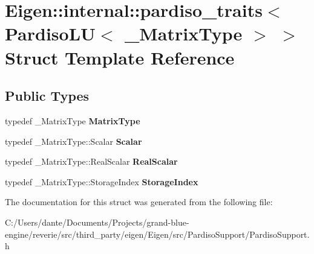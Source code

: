 \hypertarget{struct_eigen_1_1internal_1_1pardiso__traits_3_01_pardiso_l_u_3_01___matrix_type_01_4_01_4}{}\section{Eigen\+::internal\+::pardiso\+\_\+traits$<$ Pardiso\+LU$<$ \+\_\+\+Matrix\+Type $>$ $>$ Struct Template Reference}
\label{struct_eigen_1_1internal_1_1pardiso__traits_3_01_pardiso_l_u_3_01___matrix_type_01_4_01_4}
\subsection*{Public Types}
\begin{DoxyCompactItemize}
\item 
\mbox{\label{struct_eigen_1_1internal_1_1pardiso__traits_3_01_pardiso_l_u_3_01___matrix_type_01_4_01_4_a6253d589ffa5c063fde5c732c81fd6d4}} 
typedef \+\_\+\+Matrix\+Type {\bfseries Matrix\+Type}
\item 
\mbox{\label{struct_eigen_1_1internal_1_1pardiso__traits_3_01_pardiso_l_u_3_01___matrix_type_01_4_01_4_a12a540bf60b60e726d39cfe197e67bf0}} 
typedef \+\_\+\+Matrix\+Type\+::\+Scalar {\bfseries Scalar}
\item 
\mbox{\label{struct_eigen_1_1internal_1_1pardiso__traits_3_01_pardiso_l_u_3_01___matrix_type_01_4_01_4_af2ab1adecb2d6eda3747192d1cc9a978}} 
typedef \+\_\+\+Matrix\+Type\+::\+Real\+Scalar {\bfseries Real\+Scalar}
\item 
\mbox{\label{struct_eigen_1_1internal_1_1pardiso__traits_3_01_pardiso_l_u_3_01___matrix_type_01_4_01_4_a87c2c1664ec2a6a1375576173fda930a}} 
typedef \+\_\+\+Matrix\+Type\+::\+Storage\+Index {\bfseries Storage\+Index}
\end{DoxyCompactItemize}


The documentation for this struct was generated from the following file\+:\begin{DoxyCompactItemize}
\item 
C\+:/\+Users/dante/\+Documents/\+Projects/grand-\/blue-\/engine/reverie/src/third\+\_\+party/eigen/\+Eigen/src/\+Pardiso\+Support/Pardiso\+Support.\+h\end{DoxyCompactItemize}
